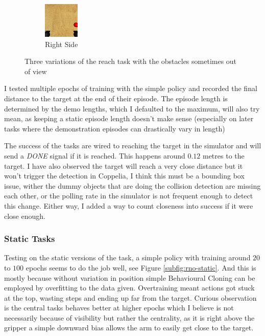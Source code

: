 \begin{figure}[htbp]
\begin{subfigure}{0.3\textwidth}
  \end{subfigure}
  \hfill
  \begin{subfigure}{0.3\textwidth}
    \centering 
    \includegraphics[width=0.6\linewidth]{assets/cam-comb/reach-no-obs/initial-obs-side_r.png}
    \caption{Right Side}
  \end{subfigure}%
  \caption{Three variations of the reach task with the obstacles sometimes out of view}\label{fig:no-obs-3-views}
\end{figure}

I tested multiple epochs of training with the simple policy and recorded the final distance to the target at the end of their episode. The episode length is determined by the demo lengths, which I defaulted to the maximum, will also try mean, as keeping a static episode length doesn't make sense (especially on later tasks where the demonstration episodes can drastically vary in length)

The success of the tasks are wired to reaching the target in the simulator and will send a \emph{DONE} signal if it is reached. This happens around $0.12$ metres to the target. I have also observed the target will reach a very close distance but it won't trigger the detection in Coppelia, I think this must be a bounding box issue, wither the dummy objects that are doing the collision detection are missing each other, or the polling rate in the simulator is not frequent enough to detect this change. Either way, I added a way to count closeness into success if it were close enough.

\subsubsection{Static Tasks}
Testing on the static versions of the task, a simple policy with training around $20$ to $100$ epochs seems to do the job well, see Figure \ref{subfig:rno-static}. And this is mostly because without variation in position simple Behavioural Cloning can be employed by overfitting to the data given. Overtraining meant actions got stuck at the top, wasting steps and ending up far from the target. Curious observation is \todo[color=purple]{} the central tasks behaves better at higher epochs which I believe is not necessarily because of visibility but rather the centrality, as it is right above the gripper a simple downward bias allows the arm to easily get close to the target.

